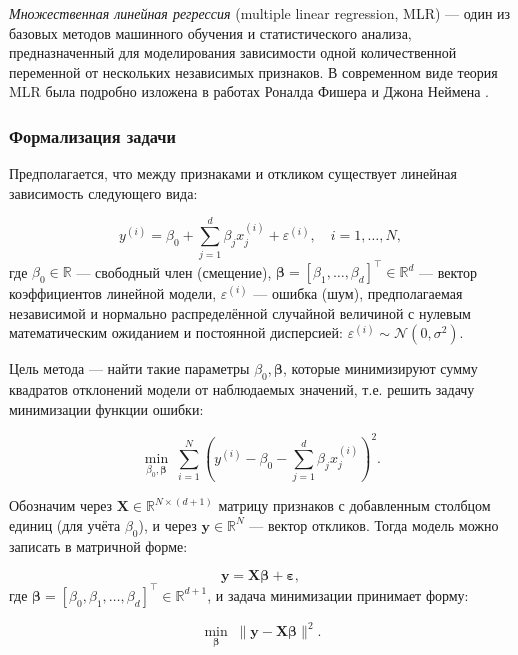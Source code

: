 \textit{Множественная линейная регрессия} (multiple linear regression, MLR) --- один из базовых методов машинного обучения и статистического анализа, предназначенный для моделирования зависимости одной количественной переменной от нескольких независимых признаков. В современном виде теория MLR была подробно изложена в работах Роналда Фишера и Джона Неймена \cite{fisher1922, rao1973}.

\subsubsection{Формализация задачи}

Предполагается, что между признаками и откликом существует линейная зависимость следующего вида:

\begin{equation}
y^{(i)} = \beta_0 + \sum_{j=1}^{d} \beta_j x_j^{(i)} + \varepsilon^{(i)}, \quad i = 1, \ldots, N,
\end{equation}
где $\beta_0 \in \mathbb{R}$ --- свободный член (смещение), $\boldsymbol{\beta} = [\beta_1, \ldots, \beta_d]^\top \in \mathbb{R}^d$ --- вектор коэффициентов линейной модели, $\varepsilon^{(i)}$ --- ошибка (шум), предполагаемая независимой и нормально распределённой случайной величиной с нулевым математическим ожиданием и постоянной дисперсией: $\varepsilon^{(i)} \sim \mathcal{N}(0, \sigma^2)$.

Цель метода --- найти такие параметры $\beta_0, \boldsymbol{\beta}$, которые минимизируют сумму квадратов отклонений модели от наблюдаемых значений, т.е. решить задачу минимизации функции ошибки:

\begin{equation}
\min_{\beta_0, \boldsymbol{\beta}} \; \sum_{i=1}^N \left( y^{(i)} - \beta_0 - \sum_{j=1}^d \beta_j x_j^{(i)} \right)^2.
\end{equation}

Обозначим через $\mathbf{X} \in \mathbb{R}^{N \times (d+1)}$ матрицу признаков с добавленным столбцом единиц (для учёта $\beta_0$), и через $\mathbf{y} \in \mathbb{R}^N$ — вектор откликов. Тогда модель можно записать в матричной форме:

\begin{equation}
\mathbf{y} = \mathbf{X} \boldsymbol{\beta} + \boldsymbol{\varepsilon},
\end{equation}
где $\boldsymbol{\beta} = [\beta_0, \beta_1, \ldots, \beta_d]^\top \in \mathbb{R}^{d+1}$, и задача минимизации принимает форму:

\begin{equation}
\min_{\boldsymbol{\beta}} \; \| \mathbf{y} - \mathbf{X} \boldsymbol{\beta} \|^2.
\end{equation}

